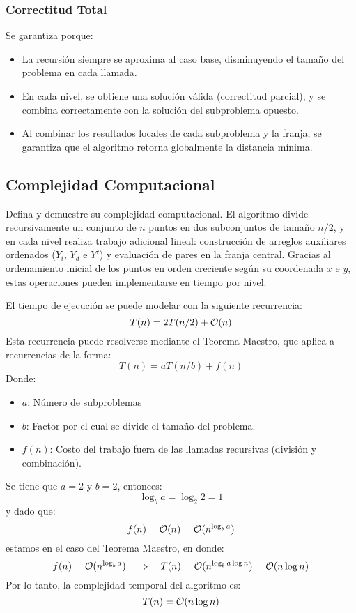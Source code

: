 \documentclass[main.tex]{subfiles}
\begin{document}
\subsubsection{\textbf{Correctitud Total}}
Se garantiza porque:

\begin{itemize}
	\item La recursión siempre se aproxima al caso base, disminuyendo el tamaño del problema en cada llamada.

	\item En cada nivel, se obtiene una solución válida (correctitud parcial), y se combina correctamente
	      con la solución del subproblema opuesto.

	\item Al combinar los resultados locales de cada subproblema y la franja, se garantiza que el algoritmo
	      retorna globalmente la distancia mínima.
\end{itemize}

\subsection{Complejidad Computacional}
Defina y demuestre su complejidad computacional.
El algoritmo divide recursivamente un conjunto de $n$ puntos en dos subconjuntos de tamaño $n/2$,
y en cada nivel realiza trabajo adicional lineal: construcción de arreglos auxiliares ordenados
($Y_i$, $Y_d$ e $Y'$)  y evaluación de pares en la franja central. Gracias al ordenamiento inicial
de los puntos en orden creciente según su coordenada $x$ e $y$, estas operaciones pueden implementarse en tiempo  por nivel.

El tiempo de ejecución se puede modelar con la siguiente recurrencia:
\[
	T(n) = 2T(n/2) + \mathcal{O}(n)
\]
Esta recurrencia puede resolverse mediante el Teorema Maestro, que aplica a recurrencias de la forma:
\[
	T(n) = aT(n/b) + f(n)
\]
Donde:
\begin{itemize}
	\item $a$: Número de subproblemas
	\item $b$: Factor por el cual se divide el tamaño del problema.
	\item $f(n)$: Costo del trabajo fuera de las llamadas recursivas (división y combinación).
\end{itemize}

Se tiene que $a = 2$ y $b = 2$, entonces:
\[
	\log_b{a} = \log_2{2} = 1
\]
y dado que:
\[
	f(n) = \mathcal{O}(n) = \mathcal{O}(n^{\log_b{a}})
\]
estamos en el caso del Teorema Maestro, en donde:
\[
	f(n) = \mathcal{O}(n^{\log_b{a}})
	\quad \Rightarrow \quad
	T(n) = \mathcal{O}(n^{\log_b{a} \log{n}}) = \mathcal{O}(n \log{n})
\]
Por lo tanto, la complejidad temporal del algoritmo es:
\[
	T(n) = \mathcal{O}(n \log{n})
\]
\end{document}

